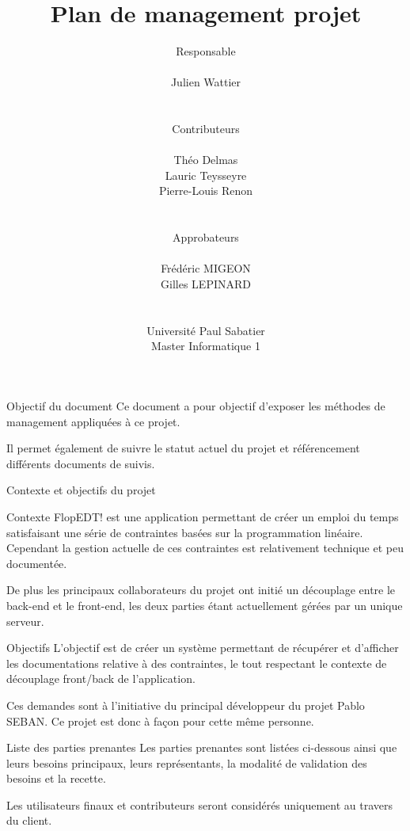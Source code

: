 \documentclass[]{article}
\title{Plan de management projet}
\author{
    Responsable\\
    \\
    Julien Wattier\\
    \\
    \\
    Contributeurs\\
    \\
    Théo Delmas\\
    Lauric Teysseyre\\
    Pierre-Louis Renon\\
    \\
    \\
    Approbateurs\\
    \\
    Frédéric MIGEON\\
    Gilles LEPINARD\\
    \\
    \\
    Université Paul Sabatier\\
    Master Informatique 1\\
   }
\date{}
\begin{document}
\maketitle
\newpage
\tableofcontents
\newpage

{
    \setlength{\parindent}{0pt} %
    \begin{section}{\label{sec:Objectif du document}Objectif du document}
     Ce document a pour objectif d'exposer les méthodes de management appliquées à ce projet.

     Il permet également de suivre le statut actuel du projet et référencement différents documents de suivis.
    \end{section}

    \begin{section}{\label{sec:Contexte et objectifs du projet}Contexte et objectifs du projet}
     \begin{subsection}{\label{sec:Context}Contexte}
         FlopEDT! est une application permettant de créer un emploi du temps satisfaisant une série de contraintes basées sur la programmation linéaire. Cependant la gestion actuelle de ces contraintes est relativement technique et peu documentée.

         De plus les principaux collaborateurs du projet ont initié un découplage entre le back-end et le front-end, les deux parties étant actuellement gérées par un unique serveur.
     \end{subsection}

     \begin{subsection}{\label{sec:Objectifs}Objectifs}
         L’objectif est de créer un système permettant de récupérer et d’afficher les documentations relative à des contraintes, le tout respectant le contexte de découplage front/back de l'application.

         Ces demandes sont à l’initiative du principal développeur du projet Pablo SEBAN. Ce projet est donc à façon pour cette même personne.
     \end{subsection}

     \begin{subsection}{\label{sec:Liste des parties prenantes}Liste des parties prenantes}
         Les parties prenantes sont listées ci-dessous ainsi que leurs besoins principaux, leurs représentants, la modalité de validation des besoins et la recette.

         Les utilisateurs finaux et contributeurs seront considérés uniquement au travers du client.


\end{subsection}
\end{section}}
\end{document}

